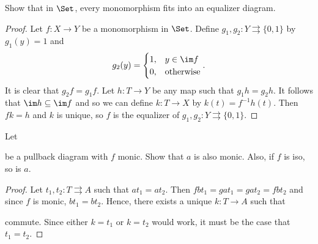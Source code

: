 \begin{exercise}{24}
    Show that in $\Set$, every monomorphism fits into an equalizer diagram.
\end{exercise}
\begin{solution}
    \begin{proof}
        Let $f:X\to Y$ be a monomorphism in $\Set$. Define $g_1,g_2\colon Y\rightrightarrows\{0,1\}$ by $g_1(y)=1$ and
        \[ g_2(y)=\begin{cases}
            1,&y\in\im f\\
            0,&\text{otherwise}
        \end{cases}. \]
        It is clear that $g_2f=g_1f$. Let $h\colon T\to Y$ be any map such that $g_1h=g_2h$.
        It follows that $\im h\subseteq\im f$ and so we can define $k\colon T\to X$ by $k(t)=f^{-1}h(t)$.
        Then $fk=h$ and $k$ is unique, so $f$ is the equalizer of $g_1,g_2\colon Y\rightrightarrows\{0,1\}$.
    \end{proof}
\end{solution}

\begin{exercise}{25}
    Let 
    be a pullback diagram with $f$ monic.
    Show that $a$ is also monic.
    Also, if $f$ is iso, so is $a$.
\end{exercise}
\begin{solution}
    \begin{proof}
        Let $t_1,t_2\colon T\rightrightarrows A$ such that $at_1=at_2$.
        Then $fbt_1=gat_1=gat_2=fbt_2$ and since $f$ is monic, $bt_1=bt_2$. 
        Hence, there exists a unique $k\colon T\to A$ such that
        \begin{center}
        \end{center}
        commute. Since either $k=t_1$ or $k=t_2$ would work, it must be the case that $t_1=t_2$.
    \end{proof}
\end{solution}

